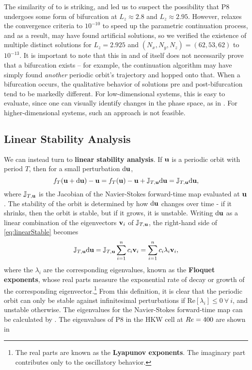  The similarity of  to  is striking, and led us to suspect the possibility that P8 undergoes some form of bifurcation at $L_z \approx 2.8$ and $L_z \approx 2.95$. However,  relaxes the convergence criteria to $10^{-10}$ to speed up the parametric continuation process, and as a result, may have found artificial solutions, so we verified the existence of multiple distinct solutions for $L_z = 2.925$ and $(N_x,N_y,N_z) = (62,53,62)$ to $10^{-13}$. It is important to note that this in and of itself does not necessarily prove that a bifurcation exists -- for example, the continuation algorithm may have simply found \emph{another} periodic orbit's trajectory and hopped onto that. When a bifurcation occurs, the qualitative behavior of solutions pre and post-bifurcation tend to be markedly different. For low-dimensional systems, this is easy to evaluate, since one can visually identify changes in the phase space, as in . For higher-dimensional systems, such an approach is not feasible. 

\subsection{Linear Stability Analysis}\label{sec:LSA}

We can instead turn to {\bf linear stability analysis}. If $\mathbf{u}$ is a periodic orbit with period $T$, then for a small perturbation ${\bf \textrm{d}}\mathbf{u}$, 
\begin{equation}\label{eq:linearStable}
 f_T(\mathbf{u} + {\bf \textrm{d}}\mathbf{u}) - \mathbf{u} =  f_T(\mathbf{u}) - \mathbf{u} + \mathbb{J}_{T,\mathbf{u}}{\bf \textrm{d}}\mathbf{u} =  \mathbb{J}_{T,\mathbf{u}}{\bf \textrm{d}}\mathbf{u},
\end{equation} 
where $ \mathbb{J}_{T,\mathbf{u}}$ is the Jacobian of the Navier-Stokes forward-time map evaluated at $\mathbf{u}$. The stability of the orbit is determined by how  ${\bf \textrm{d}}\mathbf{u}$ changes over time - if it shrinks, then the orbit is stable, but if it grows, it is unstable. Writing  ${\bf \textrm{d}}\mathbf{u}$ as a linear combination of the eigenvectors $\mathbf{v}_i$ of  $ \mathbb{J}_{T,\mathbf{u}}$, the right-hand side of \eqref{eq:linearStable} becomes
\begin{equation}\label{eq:oneOrbit}
 \mathbb{J}_{T,\Vector{u}}{\bf \textrm{d}}\Vector{u} =  \mathbb{J}_{T,\Vector{u}}\sum{i = 1}{n}{c_i\Vector{v}_i} = \sum{i = 1}{n}{c_i\lambda_i\Vector{v}_i},
\end{equation}  
where the $\lambda_i$ are the corresponding eigenvalues, known as the {\bf Floquet exponents}, whose real parts measure the exponential rate of decay or growth of the corresponding eigenvector.\footnote{The real parts are known as the {\bf Lyapunov exponents}. The imaginary part contributes only to the oscillatory behavior.}   From this definition, it is clear that the periodic orbit can only be stable against infinitesimal perturbations if $\textrm{Re}[\lambda_i]  \leq 0~\forall~i$, and unstable otherwise. The eigenvalues for the Navier-Stokes forward-time map can be calculated by . The eigenvalues of P8 in the HKW cell at $Re=400$ are shown in 

